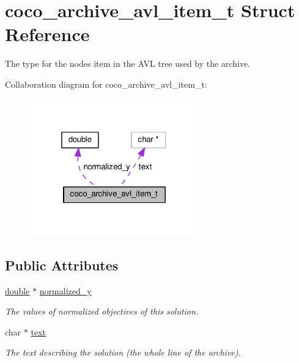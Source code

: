 \hypertarget{structcoco__archive__avl__item__t}{}\section{coco\+\_\+archive\+\_\+avl\+\_\+item\+\_\+t Struct Reference}
\label{structcoco__archive__avl__item__t}


The type for the node\textquotesingle{}s item in the A\+VL tree used by the archive.  




Collaboration diagram for coco\+\_\+archive\+\_\+avl\+\_\+item\+\_\+t\+:\nopagebreak
\begin{figure}[H]
\begin{center}
\leavevmode
\includegraphics[width=208pt]{structcoco__archive__avl__item__t__coll__graph}
\end{center}
\end{figure}
\subsection*{Public Attributes}
\begin{DoxyCompactItemize}
\item 
\hyperlink{classdouble}{double} $\ast$ \hyperlink{structcoco__archive__avl__item__t_a5bb944a448cd147ee22867f03239441d}{normalized\+\_\+y}\hypertarget{structcoco__archive__avl__item__t_a5bb944a448cd147ee22867f03239441d}{}\label{structcoco__archive__avl__item__t_a5bb944a448cd147ee22867f03239441d}

\begin{DoxyCompactList}\small\item\em The values of normalized objectives of this solution. \end{DoxyCompactList}\item 
char $\ast$ \hyperlink{structcoco__archive__avl__item__t_a2971884d20c7f22270937f72ee4aa7c8}{text}\hypertarget{structcoco__archive__avl__item__t_a2971884d20c7f22270937f72ee4aa7c8}{}\label{structcoco__archive__avl__item__t_a2971884d20c7f22270937f72ee4aa7c8}

\begin{DoxyCompactList}\small\item\em The text describing the solution (the whole line of the archive). \end{DoxyCompactList}\end{DoxyCompactItemize}


